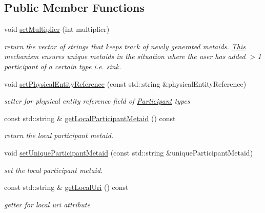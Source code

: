\subsection*{Public Member Functions}
\begin{DoxyCompactItemize}
\item 
void \hyperlink{classomexmeta_1_1Participant_a97c047d67dc86db1e617c3528bf8035e}{set\+Multiplier} (int multiplier)
\begin{DoxyCompactList}\small\item\em return the vector of strings that keeps track of newly generated metaids. \hyperlink{classThis}{This} mechanism ensures unique metaids in the situation where the user has added $>$1 participant of a certain type i.\+e. sink. \end{DoxyCompactList}\item 
void \hyperlink{classomexmeta_1_1Participant_a415c1205762dff6943426d830d74edcd}{set\+Physical\+Entity\+Reference} (const std\+::string \&physical\+Entity\+Reference)
\begin{DoxyCompactList}\small\item\em setter for physical entity reference field of \hyperlink{classomexmeta_1_1Participant}{Participant} types \end{DoxyCompactList}\item 
const std\+::string \& \hyperlink{classomexmeta_1_1Participant_a8a6626e17aca48b76465d66928eee78f}{get\+Local\+Participant\+Metaid} () const
\begin{DoxyCompactList}\small\item\em return the local participant metaid. \end{DoxyCompactList}\item 
void \hyperlink{classomexmeta_1_1Participant_a5e8f680950f55230587c0f85498c5047}{set\+Unique\+Participant\+Metaid} (const std\+::string \&unique\+Participant\+Metaid)
\begin{DoxyCompactList}\small\item\em set the local participant metaid. \end{DoxyCompactList}\item 
\mbox{\label{classomexmeta_1_1Participant_a6bf4c724ab5212d10f2a89893f369cd1}} 
const std\+::string \& \hyperlink{classomexmeta_1_1Participant_a6bf4c724ab5212d10f2a89893f369cd1}{get\+Local\+Uri} () const
\begin{DoxyCompactList}\small\item\em getter for local uri attribute \end{DoxyCompactList}\item 

\end{DoxyCompactItemize}
